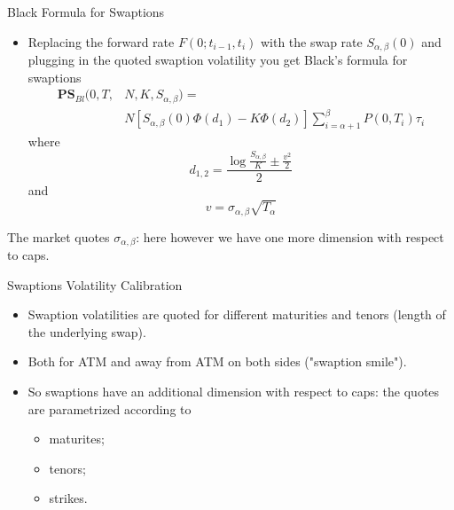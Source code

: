 \documentclass{beamer}
\begin{document}
\begin{frame}{Black Formula for Swaptions}
\begin{itemize}
	\item Replacing the forward rate $F(0;t_{i-1},t_i)$ with the swap rate $S_{\alpha,\beta}(0)$ and plugging in the quoted swaption volatility you get Black's formula for swaptions
	\begin{equation}
		\begin{aligned}
			\textbf{PS}_{Bl}(0,T,&N,K,S_{\alpha,\beta})=\\
			&N\left[S_{\alpha,\beta}(0)\Phi(d_1)-K\Phi(d_2)\right]\sum_{i=\alpha+1}^\beta P(0,T_i)\tau_i
		\end{aligned}	
	\end{equation}
	where
	\begin{equation*}
		d_{1,2} = \frac{\log{\frac{S_{\alpha,\beta}}{K}} \pm \frac{v^2}{2}}{2}
	\end{equation*}
	and
	\begin{equation*}
		v = \sigma_{\alpha,\beta}\sqrt{T_\alpha}
	\end{equation*}
\end{itemize}
The market quotes $\sigma_{\alpha,\beta}$: here however we have one more dimension with respect to caps.
\end{frame}

\begin{frame}{Swaptions Volatility Calibration}
\begin{itemize}
	\item Swaption volatilities are quoted for different maturities and tenors (length of the underlying swap).
	\item Both for ATM and away from ATM on both sides ("swaption smile").
	\item So swaptions have an additional dimension with respect to caps: the quotes are parametrized according to 
	\begin{itemize}
		\item maturites;
		\item tenors;
		\item strikes.
	\end{itemize}
\end{itemize}
\end{frame}
\end{document}
